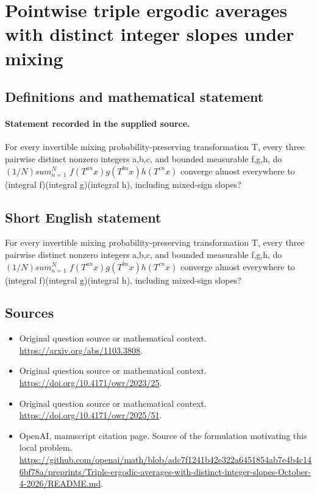 \documentclass[11pt]{article}
\begin{document}
\section*{Pointwise triple ergodic averages with distinct integer slopes under mixing}\label{30007166}
\subsection{Definitions and mathematical statement}
\paragraph{Statement recorded in the supplied source.}
For every invertible mixing probability-preserving transformation T, every three pairwise distinct nonzero integers a,b,c, and bounded measurable f,g,h, do $(1/N)sum_{n=1}^N$ $f(T^{an}x)g(T^{bn}x)h(T^{cn}x)$ converge almost everywhere to (integral f)(integral g)(integral h), including mixed-sign slopes?
\subsection{Short English statement}
For every invertible mixing probability-preserving transformation T, every three pairwise distinct nonzero integers a,b,c, and bounded measurable f,g,h, do $(1/N)sum_{n=1}^N$ $f(T^{an}x)g(T^{bn}x)h(T^{cn}x)$ converge almost everywhere to (integral f)(integral g)(integral h), including mixed-sign slopes?
\subsection{Sources}
\begin{itemize}
\item[S1] Original question source or mathematical context.
\url{https://arxiv.org/abs/1103.3808}.
\item[S2] Original question source or mathematical context.
\url{https://doi.org/10.4171/owr/2023/25}.
\item[S3] Original question source or mathematical context.
\url{https://doi.org/10.4171/owr/2025/51}.
\item[S4] OpenAI, manuscript citation page. Source of the formulation motivating this local problem.
\url{https://github.com/openai/math/blob/adc7f1241b42e322a6451854ab7e4b4c146bf78a/preprints/Triple-ergodic-averages-with-distinct-integer-slopes-October-4-2026/README.md}.
\end{itemize}
\end{document}
